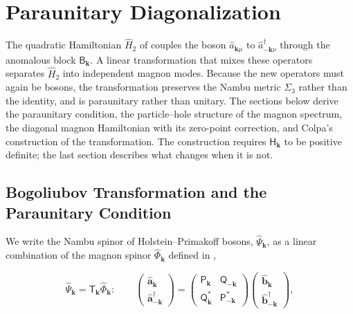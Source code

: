 
\hypertarget{sec-lswt-paraunitary-diagonalization}{%
\section{Paraunitary Diagonalization}\label{sec-lswt-paraunitary-diagonalization}}

The quadratic Hamiltonian \(\hat H_2\) of  couples the boson \(\hat a_{\mathbf k\mu}\) to \(\hat a_{-\mathbf k\nu}^\dagger\) through the anomalous block \(\mathsf B_{\mathbf k}\). A linear transformation that mixes these operators separates \(\hat H_2\) into independent magnon modes. Because the new operators must again be bosons, the transformation preserves the Nambu metric \(\Sigma_3\) rather than the identity, and is paraunitary rather than unitary. The sections below derive the paraunitary condition, the particle--hole structure of the magnon spectrum, the diagonal magnon Hamiltonian with its zero-point correction, and Colpa's construction of the transformation. The construction requires \(\mathsf H_{\mathbf k}\) to be positive definite; the last section describes what changes when it is not.

\subsection{Bogoliubov Transformation and the Paraunitary Condition}

We write the Nambu spinor of Holstein--Primakoff bosons, \(\hat\Psi_{\mathbf k}\), as a linear combination of the magnon spinor \(\hat\Phi_{\mathbf k}\) defined in ,

\begin{equation}\label{eq-lswt-bogoliubov-transformation}
\hat\Psi_{\mathbf k}=\mathsf T_{\mathbf k}\hat\Phi_{\mathbf k}:
\qquad
\begin{pmatrix}
\hat{\mathbf a}_{\mathbf k}\\
\hat{\mathbf a}_{-\mathbf k}^\dagger
\end{pmatrix}
=\begin{pmatrix}
\mathsf P_{\mathbf k} & \mathsf Q_{-\mathbf k}\\
\mathsf Q_{\mathbf k}^* & \mathsf P_{-\mathbf k}^*
\end{pmatrix}
\begin{pmatrix}
\hat{\mathbf b}_{\mathbf k}\\
\hat{\mathbf b}_{-\mathbf k}^\dagger
\end{pmatrix},
\end{equation}

